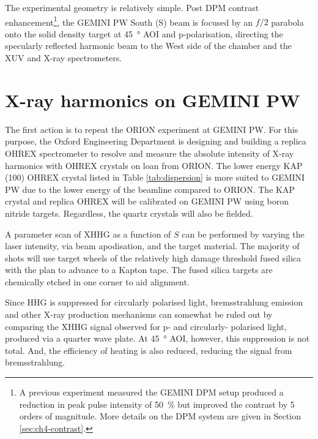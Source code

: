 

The experimental geometry is relatively simple. Post \ac{DPM} contrast enhancement\footnote{A previous experiment measured the GEMINI DPM setup produced a reduction in peak pulse intensity of \qty{50}{\%} but improved the contrast by 5 orders of magnitude. More details on the DPM system are given in Section \ref{sec:ch4-contrast}.}, the GEMINI PW South (S) beam is focused by an $f/2$ parabola onto the solid density target at \qty{45}{\degree} \ac{AOI} and p-polarisation, directing the specularly reflected harmonic beam to the West side of the chamber and the XUV and X-ray spectrometers.

\section{X-ray harmonics on GEMINI PW}\label{sec:ch4-xray}
The first action is to repeat the ORION experiment at GEMINI PW. For this purpose, the Oxford Engineering Department is designing and building a replica OHREX spectrometer to resolve and measure the absolute intensity of X-ray harmonics with OHREX crystals on loan from ORION. The lower energy KAP (100) OHREX crystal listed in Table \ref{tab:dispersion} is more suited to GEMINI PW due to the lower energy of the beamline compared to ORION. The KAP crystal and replica OHREX will be calibrated on GEMINI PW using boron nitride targets. Regardless, the quartz crystals will also be fielded. 

A parameter scan of \ac{XHHG} as a function of $S$ can be performed by varying the laser intensity, via beam apodisation, and the target material. The majority of shots will use target wheels of the relatively high damage threshold fused silica with the plan to advance to a Kapton tape. The fused silica targets are chemically etched in one corner to aid alignment.

Since HHG is suppressed for circularly polarised light, bremsstrahlung emission and other X-ray production mechanisms can somewhat be ruled out by comparing the \ac{XHHG} signal observed for p- and circularly- polarised light, produced via a quarter wave plate. At \qty{45}{\degree} \ac{AOI}, however, this suppression is not total. And, the efficiency of heating is also reduced, reducing the signal from bremsstrahlung.

